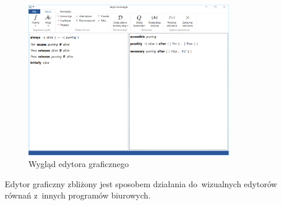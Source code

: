 \documentclass[11pt,a4paper]{article}
\begin{document}
\begin{figure}[H]
    \centering
    \includegraphics[width=0.8\textwidth]{res/img/visual-editor.png}
    \caption{Wygląd edytora graficznego}
    \label{fig:visual-editor}
\end{figure}

Edytor graficzny zbliżony jest sposobem działania do~wizualnych edytorów równań z~innych programów biurowych.
\end{document}
